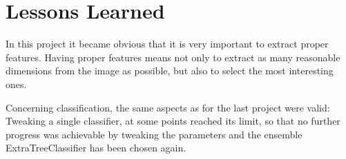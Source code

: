 \documentclass[a4paper, 11pt]{article}
\begin{document}
	\section{Lessons Learned} 
	In this project it became obvious that it is very important to extract proper features. Having proper features means not only to extract as many reasonable dimensions from the image as possible, but also to select the most interesting ones.

	Concerning classification, the same aspects as for the last project were valid: Tweaking a single classifier, at some points reached its limit, so that no further progress was achievable by tweaking the parameters and the ensemble ExtraTreeClassifier has been chosen again.
	
\end{document}
